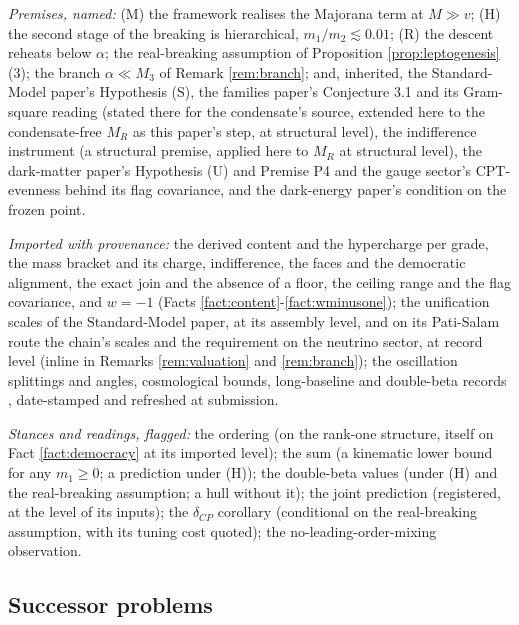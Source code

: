 \documentclass[11pt]{article}
\theoremstyle{definition}
\begin{document}
\emph{Premises, named:} (M) the framework realises the Majorana term at $M \gg v$; (H) the second stage of the breaking is hierarchical, $m_{1}/m_{2} \lesssim 0.01$; (R) the descent reheats below $\alpha$; the real-breaking assumption of Proposition \ref{prop:leptogenesis}(3); the branch $\alpha \ll M_{3}$ of Remark \ref{rem:branch}; and, inherited, the Standard-Model paper's Hypothesis (S), the families paper's Conjecture 3.1 and its Gram-square reading (stated there for the condensate's source, extended here to the condensate-free $M_{R}$ as this paper's step, at structural level), the indifference instrument (a structural premise, applied here to $M_{R}$ at structural level), the dark-matter paper's Hypothesis (U) and Premise P4 and the gauge sector's CPT-evenness behind its flag covariance, and the dark-energy paper's condition on the frozen point.

\emph{Imported with provenance:} the derived content and the hypercharge per grade, the mass bracket and its charge, indifference, the faces and the democratic alignment, the exact join and the absence of a floor, the ceiling range and the flag covariance, and $w = -1$ (Facts \ref{fact:content}-\ref{fact:wminusone}); the unification scales of the Standard-Model paper, at its assembly level, and on its Pati-Salam route the chain's scales and the requirement on the neutrino sector, at record level (inline in Remarks \ref{rem:valuation} and \ref{rem:branch}); the oscillation splittings and angles, cosmological bounds, long-baseline and double-beta records \cite{PDG2024, NuFIT2024, DESI2025, HouWangZhaoZhang2026, T2KNOvA2025, KamLANDZen2023, LEGEND2021}, date-stamped and refreshed at submission.

\emph{Stances and readings, flagged:} the ordering (on the rank-one structure, itself on Fact \ref{fact:democracy} at its imported level); the sum (a kinematic lower bound for any $m_{1} \ge 0$; a prediction under (H)); the double-beta values (under (H) and the real-breaking assumption; a hull without it); the joint prediction (registered, at the level of its inputs); the $\delta_{CP}$ corollary (conditional on the real-breaking assumption, with its tuning cost quoted); the no-leading-order-mixing observation.

\subsection*{Successor problems}
\end{document}
